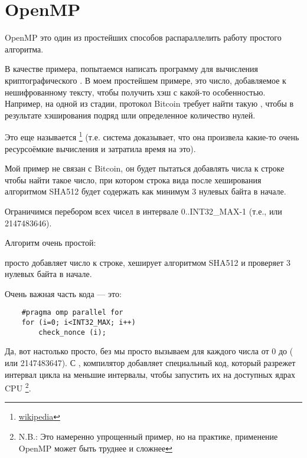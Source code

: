 \section{OpenMP}
\label{openmp}

OpenMP это один из простейших способов распараллелить работу простого алгоритма.

В качестве примера, попытаемся написать программу для вычисления криптографического .
В моем простейшем примере,  это число, добавляемое к нешифрованному тексту, чтобы получить
хэш с какой-то особенностью.
Например, на одной из стадии, протокол Bitcoin требует найти такую , чтобы в результате
хэширования подряд шли определенное количество нулей.

Это еще называется 
\footnote{\href{http://go.yurichev.com/17100}{wikipedia}} 
(т.е. система доказывает, что она произвела какие-то очень ресурсоёмкие вычисления и затратила
время на это).

Мой пример не связан с Bitcoin, 
он будет пытаться добавлять числа к строке 
чтобы найти такое число, при котором строка вида 
 после хеширования алгоритмом SHA512 будет содержать как минимум 3 нулевых
байта в начале.

Ограничимся перебором всех чисел в интервале
0..INT32\_MAX-1 (т.е.,  или 2147483646).

Алгоритм очень простой:



 просто добавляет число к строке, хеширует алгоритмом SHA512 и проверяет 
3 нулевых байта в начале.

Очень важная часть кода --- это:

\begin{lstlisting}
	#pragma omp parallel for
	for (i=0; i<INT32_MAX; i++)
		check_nonce (i);
\end{lstlisting}

Да, вот настолько просто, без  мы просто вызываем
  для каждого числа от 0 до 
 ( или 2147483647).
С , компилятор добавляет специальный код, который разрежет интервал цикла
на меньшие интервалы, чтобы запустить их на доступных ядрах \ac{CPU}
\footnote{N.B.: Это намеренно упрощенный пример, но на практике, 
применение OpenMP может быть труднее и сложнее}.

